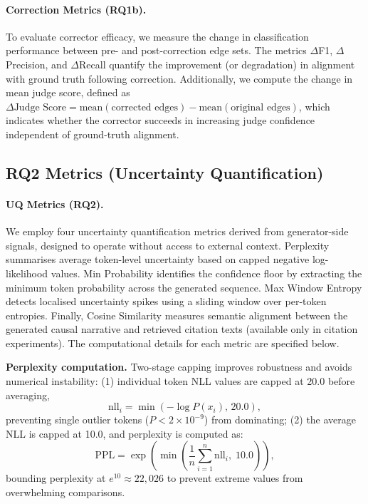 \paragraph{Correction Metrics (RQ1b).}
To evaluate corrector efficacy, we measure the change in classification performance between pre- and post-correction edge sets. The metrics $\Delta$F1, $\Delta$Precision, and $\Delta$Recall quantify the improvement (or degradation) in alignment with ground truth following correction. Additionally, we compute the change in mean judge score, defined as $\Delta\text{Judge Score} = \text{mean}(\text{corrected edges}) - \text{mean}(\text{original edges})$, which indicates whether the corrector succeeds in increasing judge confidence independent of ground-truth alignment.

\subsection{RQ2 Metrics (Uncertainty Quantification)}
\label{sec:metrics_rq2}

\paragraph{UQ Metrics (RQ2).}\label{sec:uq_metrics_capping}
We employ four uncertainty quantification metrics derived from generator-side signals, designed to operate without access to external context. Perplexity summarises average token-level uncertainty based on capped negative log-likelihood values. Min Probability identifies the confidence floor by extracting the minimum token probability across the generated sequence. Max Window Entropy detects localised uncertainty spikes using a sliding window over per-token entropies. Finally, Cosine Similarity measures semantic alignment between the generated causal narrative and retrieved citation texts (available only in citation experiments). The computational details for each metric are specified below.

\noindent\textbf{Perplexity computation.} Two-stage capping improves robustness and avoids numerical instability: (1) individual token NLL values are capped at 20.0 before averaging,
\[
\mathrm{nll}_i=\min\!\left(-\log P(x_i),\,20.0\right),
\]
preventing single outlier tokens (\(P<2\times 10^{-9}\)) from dominating; (2) the average NLL is capped at 10.0, and perplexity is computed as:
\[
\mathrm{PPL} = \exp\!\left(\min\!\left(\frac{1}{n}\sum_{i=1}^{n}\mathrm{nll}_i,\;10.0\right)\right),
\]
bounding perplexity at \(e^{10}\approx 22{,}026\) to prevent extreme values from overwhelming comparisons.

